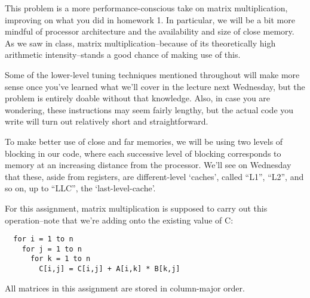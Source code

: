 \documentclass[11pt]{article}
\begin{document}
\bigskip
{}

This problem is a more performance-conscious take on matrix
multiplication, improving on what you did in homework 1. In
particular, we will be a bit more mindful of processor architecture
and the availability and size of close memory. As we saw in class,
matrix multiplication--because of its theoretically high arithmetic
intensity--stands a good chance of making use of this.

Some of the lower-level tuning techniques mentioned throughout will
make more sense once you've learned what we'll cover in the lecture
next Wednesday, but the problem is entirely doable without that
knowledge. Also, in case you are wondering, these instructions may
seem fairly lengthy, but the actual code you write will turn out
relatively short and straightforward.

To make better use of close and far memories, we will be using two
levels of blocking in our code, where each successive level of
blocking corresponds to memory at an increasing distance from the
processor. We'll see on Wednesday that these, aside from registers,
are different-level `caches', called ``L1'', ``L2'', and so on, up to
``LLC'', the `last-level-cache'.

For this assignment, matrix multiplication is supposed to carry out
this operation--note that we're adding onto the existing value of C:
\begin{lstlisting}
  for i = 1 to n
    for j = 1 to n
      for k = 1 to n
        C[i,j] = C[i,j] + A[i,k] * B[k,j]
\end{lstlisting}
All matrices in this assignment are stored in column-major order.
\end{document}

